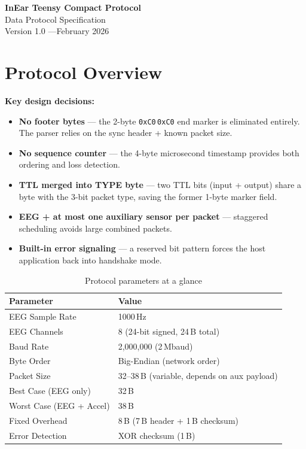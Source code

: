 \documentclass[11pt,a4paper]{article}
\newcommand{\hexval}[1]{\texttt{0x#1}}
\begin{document}
\begin{center}
    {\LARGE\bfseries InEar Teensy Compact Protocol} \\[0.5em]
    {\large Data Protocol Specification} \\[1em]
    {\small Version 1.0 \quad---\quad February 2026}
\end{center}

\vspace{1em}
\tableofcontents
\vspace{1.5em}

\newpage
\section{Protocol Overview}
\label{sec:overview}

\medskip\noindent
\textbf{Key design decisions:}

\begin{itemize}
    \item \textbf{No footer bytes} --- the 2-byte \hexval{C0}\,\hexval{C0} end marker is eliminated entirely.  The parser relies on the sync header + known packet size.
    \item \textbf{No sequence counter} --- the 4-byte microsecond timestamp provides both ordering and loss detection.
    \item \textbf{TTL merged into TYPE byte} --- two TTL bits (input + output) share a byte with the 3-bit packet type, saving the former 1-byte marker field.
    \item \textbf{EEG + at most one auxiliary sensor per packet} --- staggered scheduling avoids large combined packets.
    \item \textbf{Built-in error signaling} --- a reserved bit pattern forces the host application back into handshake mode.
\end{itemize}

\begin{table}[H]
\centering
\caption{Protocol parameters at a glance}
\label{tab:overview}
\begin{tabular}{|l|l|}
\hline
\textbf{Parameter} & \textbf{Value} \\\hline
\hline
EEG Sample Rate & 1000\,Hz \\
EEG Channels & 8 (24-bit signed, 24\,B total) \\
Baud Rate & 2,000,000 (2\,Mbaud) \\
Byte Order & Big-Endian (network order) \\
Packet Size & 32--38\,B (variable, depends on aux payload) \\
Best Case (EEG only) & 32\,B \\
Worst Case (EEG + Accel) & 38\,B \\
Fixed Overhead & 8\,B (7\,B header + 1\,B checksum) \\
Error Detection & XOR checksum (1\,B) \\
\hline
\end{tabular}
\end{table}
\end{document}
